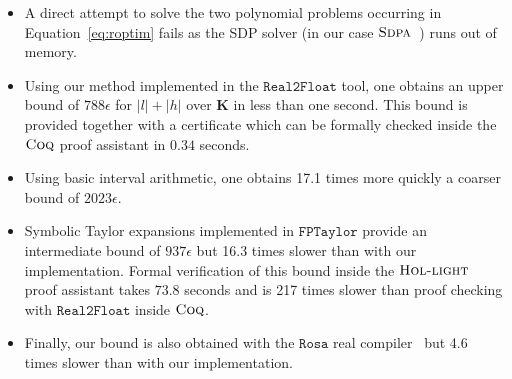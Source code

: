 \documentclass[preprint,fleqn,nocopyrightspace]{sigplanconf}
\def\E{\mathbf{E}}
\def\K{\mathbf{K}}
\def\X{\mathbf{X}}
\newcommand{\realtofloat}{\mathtt{Real2Float}}
\newcommand{\hol}{\text{\sc Hol-light}}
\newcommand{\coq}{\text{\sc Coq}}
\newcommand{\rosa}{\mathtt{Rosa}}
\newcommand{\sdpa}{\text{\sc Sdpa}}
\newcommand{\fptaylor}{\mathtt{FPTaylor}}
\theoremstyle{plain}
\begin{document}
\begin{itemize}[noitemsep,nolistsep]
\item A direct attempt to solve the two polynomial problems occurring in Equation~\eqref{eq:roptim} fails as the SDP solver (in our case $\sdpa$~\cite{sdpa7}) runs out of memory. 
\item Using our method implemented in the $\realtofloat$ tool, one obtains an upper bound of $788 \epsilon$ for $|l| + |h|$ over $\K$ in less than one second. This bound is provided together with a certificate which can be formally checked inside the $\coq$ proof assistant in $0.34$ seconds.
\item Using basic interval arithmetic, one obtains 17.1 times more quickly a coarser bound of $2023 \epsilon$. 
\item Symbolic Taylor expansions implemented in $\fptaylor$ \cite{fptaylor15} provide an intermediate bound of $937 \epsilon$ but 16.3 times slower than with our implementation. Formal verification of this bound inside the $\hol$ proof assistant takes $73.8$ seconds and is 217 times slower than proof checking with $\realtofloat$ inside $\coq$.
\item Finally, our bound is also obtained with the $\rosa$ real compiler~\cite{Darulova14Popl} but 4.6 times slower than with our implementation.
\end{itemize}
%
\end{document}
